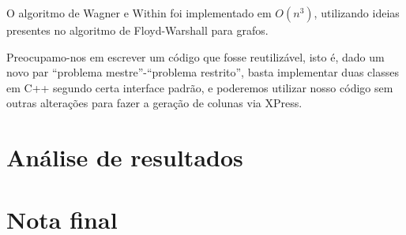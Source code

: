 \documentclass[letterpaper,11pt]{article}
\begin{document}
O algoritmo de Wagner e Within foi implementado em $O(n^3)$, utilizando
ideias presentes no algoritmo de Floyd-Warshall para grafos.  

Preocupamo-nos em escrever um código que fosse reutilizável, isto é,
dado um novo par ``problema mestre''-``problema restrito'', basta
implementar duas classes em C++ segundo certa interface padrão, e
poderemos utilizar nosso código sem outras alterações para fazer a
geração de colunas via XPress.

\section{Análise de resultados}

\section{Nota final}




\end{document}
